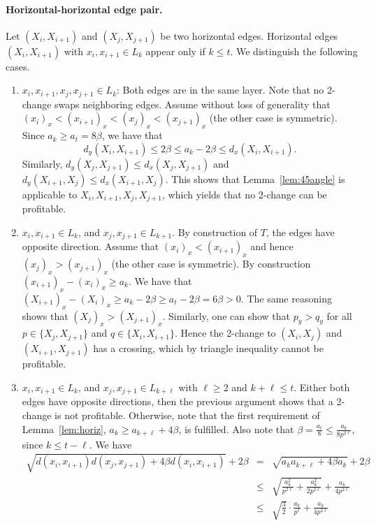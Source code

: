 \documentclass[11pt,DIV=12,a4paper]{scrartcl}
\begin{document}
\paragraph{Horizontal-horizontal edge pair.} Let $(X_i,X_{i+1})$ and $(X_j,X_{j+1})$ be two horizontal edges. Horizontal edges $(X_i,X_{i+1})$ with $x_i,x_{i+1}\in L_k$ appear only if $k\le t$. We distinguish the following cases.
\begin{enumerate}
\item $x_i,x_{i+1},x_j, x_{j+1} \in L_k$: Both edges are in the same layer. Note that no 2-change swaps neighboring edges. Assume without loss of generality that $(x_i)_x < (x_{i+1})_x < (x_j)_x < (x_{j+1})_x$ (the other case is symmetric). Since $a_k \ge a_t =  8\beta$, we have that
\[d_y(X_i,X_{i+1}) \le 2\beta \le a_k - 2\beta \le d_x(X_i,X_{i+1}).\]
Similarly, $d_y(X_j,X_{j+1}) \le d_x(X_j,X_{j+1})$ and $d_y(X_{i+1},X_j) \le d_x(X_{i+1},X_j)$. This shows that Lemma~\ref{lem:45angle} is applicable to $X_i,X_{i+1},X_{j},X_{j+1}$, which yields that no 2-change can be profitable.
\item $x_i,x_{i+1} \in L_k$, and $x_j,x_{j+1}\in L_{k+1}$. By construction of $T$, the edges have opposite direction. Assume that $(x_i)_x < (x_{i+1})_x$ and hence $(x_j)_x > (x_{j+1})_x$ (the other case is symmetric). By construction $(x_{i+1})_x - (x_i)_x \ge a_k$. We have that $(X_{i+1})_x - (X_i)_x \ge a_k - 2\beta \ge a_t - 2\beta = 6\beta > 0$. The same reasoning shows that $(X_j)_x > (X_{j+1})_x$. Similarly, one can show that $p_y > q_y$ for all $p\in \{X_j, X_{j+1}\}$ and $q\in \{X_i, X_{i+1}\}$.  Hence the 2-change to $(X_i,X_j)$ and $(X_{i+1},X_{j+1})$ has a crossing, which by triangle inequality cannot be profitable.
\item $x_i,x_{i+1} \in L_k$, and $x_j,x_{j+1} \in L_{k+\ell}$ with $\ell \ge 2$ and $k+\ell \le t$. Either both edges have opposite directions, then the previous argument shows that a 2-change is not profitable. Otherwise, note that the first requirement of Lemma~\ref{lem:horiz}, $a_k \ge a_{k+\ell} + 4\beta$, is fulfilled. Also note that $\beta = \frac{a_t}{8} \le \frac{a_k}{8p^{2\ell}}$, since $k\le t-\ell$. We have
\begin{eqnarray*} 
\sqrt{d(x_i,x_{i+1})d(x_j,x_{j+1}) + 4\beta d(x_i,x_{i+1})} + 2\beta & = & \sqrt{a_k a_{k+\ell} + 4\beta a_k} + 2\beta \\
& \le & \sqrt{\frac{a_k^2}{p^{2\ell}}  + \frac{a^2_k}{2p^{2\ell}}} + \frac{a_k}{4p^{2\ell}} \\
& \le & \sqrt{\frac{3}{2}}\cdot \frac{a_k}{p^\ell} + \frac{a_k}{4p^{2\ell}} \\

\end{eqnarray*}
\end{enumerate}
\end{document}
